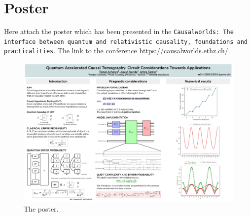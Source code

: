 \documentclass[
 aps,
 jmp,
 amsmath,amssymb,
 reprint,
]{revtex4-2}
\begin{document}
\section{Poster}
Here attach the poster which has been presented in the \texttt{Causalworlds: The interface between quantum and relativistic causality, foundations and practicalities}. The link to the conference  \href{https://causalworlds.ethz.ch/}{https://causalworlds.ethz.ch/}.
\begin{figure}
    \centering
    \includegraphics[width = \linewidth]{poster/practical_error_probability.pdf}
    \caption{The poster.}
    \label{fig:my_label}
\end{figure}

\nocite{*}
\end{document}
